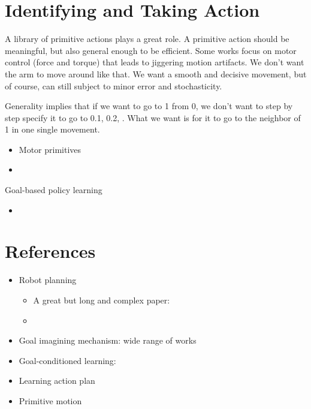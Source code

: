 \section{Identifying and Taking Action}
A library of primitive actions plays a great role. A primitive action should be meaningful, but also general enough to be efficient. Some works focus on motor control (force and torque) that leads to jiggering motion artifacts. We don't want the arm to move around like that. We want a smooth and decisive movement, but of course, can still subject to minor error and stochasticity.

Generality implies that if we want to go to 1 from 0, we don't want to step by step specify it to go to 0.1, 0.2, \etc. What we want is for it to go to the neighbor of 1 in one single movement.

\begin{itemize}
	\item Motor primitives \cite{ijspeert2002movement}
	\item \todo{}
\end{itemize}

Goal-based policy learning
\begin{itemize}
	\item 
\end{itemize}

\section{References}
\todo{}
\begin{itemize}
	\item Robot planning
	\begin{itemize}
		\item \note A great but long and complex paper: 
		\item {}
	\end{itemize}
	\item Goal imagining mechanism: wide range of works
	\item Goal-conditioned learning:
	\item Learning action plan
	\item Primitive motion
\end{itemize}